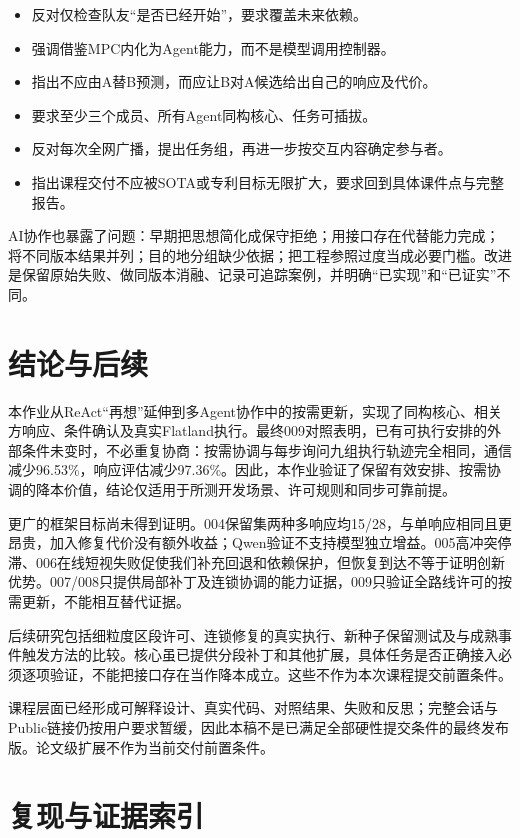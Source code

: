 \begin{itemize}
\tightlist
\item
  反对仅检查队友``是否已经开始''，要求覆盖未来依赖。
\item
  强调借鉴MPC内化为Agent能力，而不是模型调用控制器。
\item
  指出不应由A替B预测，而应让B对A候选给出自己的响应及代价。
\item
  要求至少三个成员、所有Agent同构核心、任务可插拔。
\item
  反对每次全网广播，提出任务组，再进一步按交互内容确定参与者。
\item
  指出课程交付不应被SOTA或专利目标无限扩大，要求回到具体课件点与完整报告。
\end{itemize}

AI协作也暴露了问题：早期把思想简化成保守拒绝；用接口存在代替能力完成；将不同版本结果并列；目的地分组缺少依据；把工程参照过度当成必要门槛。改进是保留原始失败、做同版本消融、记录可追踪案例，并明确``已实现''和``已证实''不同。

\hypertarget{ux7ed3ux8bbaux4e0eux540eux7eed}{%
\chapter{结论与后续}\label{ux7ed3ux8bbaux4e0eux540eux7eed}}

本作业从ReAct``再想''延伸到多Agent协作中的按需更新，实现了同构核心、相关方响应、条件确认及真实Flatland执行。最终009对照表明，已有可执行安排的外部条件未变时，不必重复协商：按需协调与每步询问九组执行轨迹完全相同，通信减少96.53\%，响应评估减少97.36\%。因此，本作业验证了保留有效安排、按需协调的降本价值，结论仅适用于所测开发场景、许可规则和同步可靠前提。

更广的框架目标尚未得到证明。004保留集两种多响应均15/28，与单响应相同且更昂贵，加入修复代价没有额外收益；Qwen验证不支持模型独立增益。005高冲突停滞、006在线短视失败促使我们补充回退和依赖保护，但恢复到达不等于证明创新优势。007/008只提供局部补丁及连锁协调的能力证据，009只验证全路线许可的按需更新，不能相互替代证据。

后续研究包括细粒度区段许可、连锁修复的真实执行、新种子保留测试及与成熟事件触发方法的比较。核心虽已提供分段补丁和其他扩展，具体任务是否正确接入必须逐项验证，不能把接口存在当作降本成立。这些不作为本次课程提交前置条件。

课程层面已经形成可解释设计、真实代码、对照结果、失败和反思；完整会话与Public链接仍按用户要求暂缓，因此本稿不是已满足全部硬性提交条件的最终发布版。论文级扩展不作为当前交付前置条件。

\hypertarget{ux590dux73b0ux4e0eux8bc1ux636eux7d22ux5f15}{%
\chapter{复现与证据索引}\label{ux590dux73b0ux4e0eux8bc1ux636eux7d22ux5f15}}

